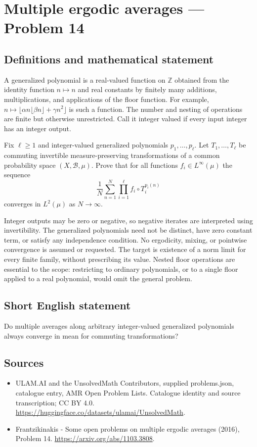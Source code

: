 \documentclass[11pt,a4paper]{article}
\begin{document}
\section*{Multiple ergodic averages — Problem 14}\label{statement}

\subsection{Definitions and mathematical statement}
A generalized polynomial is a real-valued function on
$\mathbb Z$ obtained from the identity function $n\mapsto n$
and real constants by finitely many additions,
multiplications, and applications of the floor function.
For example, $n\mapsto\lfloor\alpha n\lfloor\beta n\rfloor
+\gamma n^2\rfloor$ is such a function. The number and
nesting of operations are finite but otherwise unrestricted.
Call it integer valued if every input integer has an
integer output.

Fix $\ell\ge1$ and integer-valued generalized polynomials
$p_1,\ldots,p_\ell$. Let $T_1,\ldots,T_\ell$ be commuting
invertible measure-preserving transformations of a common
probability space $(X,\mathcal B,\mu)$. Prove that for
all functions $f_i\in L^\infty(\mu)$ the sequence
\[
          \frac1N\sum_{n=1}^N
               \prod_{i=1}^\ell f_i\circ T_i^{p_i(n)}
\]
converges in $L^2(\mu)$ as $N\to\infty$.

Integer outputs may be zero or negative, so negative
iterates are interpreted using invertibility. The
generalized polynomials need not be distinct, have
zero constant term, or satisfy any independence
condition. No ergodicity, mixing, or pointwise
convergence is assumed or requested. The target is
existence of a norm limit for every finite family,
without prescribing its value. Nested floor operations
are essential to the scope: restricting to ordinary
polynomials, or to a single floor applied to a real
polynomial, would omit the general problem.
\subsection{Short English statement}
Do multiple averages along arbitrary integer-valued generalized polynomials always converge in mean for commuting transformations?
\subsection{Sources}
\begin{itemize}
\item[S1] ULAM.AI and the UnsolvedMath Contributors, supplied problems.json, catalogue entry, AMR Open Problem Lists. Catalogue identity and source transcription; CC BY 4.0.
\url{https://huggingface.co/datasets/ulamai/UnsolvedMath}.
\item[S2] Frantzikinakis - Some open problems on multiple ergodic averages (2016), Problem 14. 
\url{https://arxiv.org/abs/1103.3808}.
\end{itemize}
\end{document}

